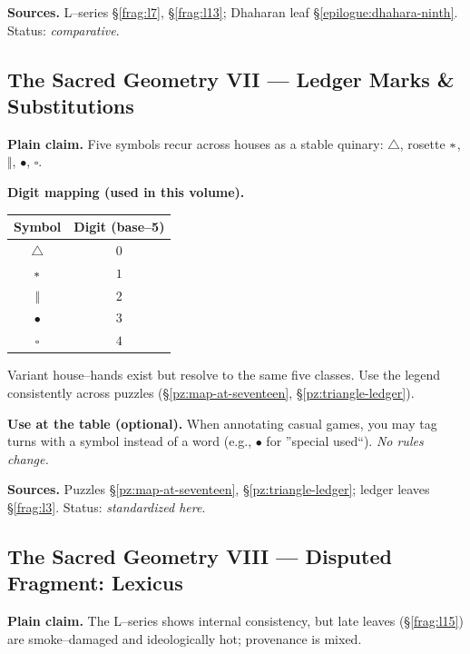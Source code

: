 \documentclass[11pt]{article}
\numberwithin{equation}{section} %
\theoremstyle{plain} %
\theoremstyle{definition} %
\theoremstyle{remark} %
\begin{document}
\medskip
\noindent\textbf{Sources.} L--series \S\ref{frag:l7}, \S\ref{frag:l13}; Dhaharan leaf \S\ref{epilogue:dhahara-ninth}. Status: \emph{comparative}.

\subsection{The Sacred Geometry VII --- Ledger Marks \& Substitutions}
\label{geometry:ledger-marks}

\noindent\textbf{Plain claim.} Five symbols recur across houses as a stable quinary: \(\triangle\), rosette \(\large\ast\), \(\Vert\), \(\bullet\), \(\square\).

\medskip
\noindent\textbf{Digit mapping (used in this volume).}
\begin{center}
\begin{tabular}{c|c}
\textbf{Symbol} & \textbf{Digit (base--5)} \\
\hline
\(\triangle\) & \(0\) \\
\(\large\ast\) & \(1\) \\
\(\Vert\) & \(2\) \\
\(\bullet\) & \(3\) \\
\(\square\) & \(4\) \\
\end{tabular}
\end{center}
Variant house--hands exist but resolve to the same five classes. Use the legend consistently across puzzles (\S\ref{pz:map-at-seventeen}, \S\ref{pz:triangle-ledger}).

\medskip
\noindent\textbf{Use at the table (optional).} When annotating casual games, you may tag turns with a symbol instead of a word (e.g., \(\bullet\) for ''special used``). \emph{No rules change.}

\medskip
\noindent\textbf{Sources.} Puzzles \S\ref{pz:map-at-seventeen}, \S\ref{pz:triangle-ledger}; ledger leaves \S\ref{frag:l3}. Status: \emph{standardized here}.

\subsection{The Sacred Geometry VIII --- Disputed Fragment: Lexicus}
\label{geometry:lexicus-disputed}

\noindent\textbf{Plain claim.} The L--series shows internal consistency, but late leaves (\S\ref{frag:l15}) are smoke--damaged and ideologically hot; provenance is mixed.
\end{document}
